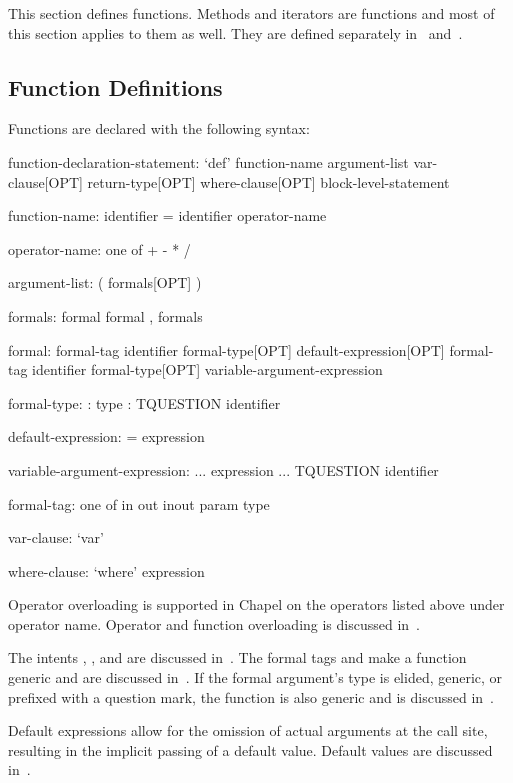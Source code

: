 \label{Functions}

This section defines functions.  Methods and iterators are functions
and most of this section applies to them as well.  They are defined
separately in~ and~.

\subsection{Function Definitions}
\label{Function_Definitions}

Functions are declared with the following syntax:
\begin{syntax}
function-declaration-statement:
  `def' function-name argument-list var-clause[OPT]
    return-type[OPT] where-clause[OPT] block-level-statement

function-name:
  identifier
  = identifier
  operator-name

operator-name: one of
  + - * / %

argument-list:
  ( formals[OPT] )

formals:
  formal
  formal , formals

formal:
  formal-tag identifier formal-type[OPT] default-expression[OPT]
  formal-tag identifier formal-type[OPT] variable-argument-expression

formal-type:
  : type
  : TQUESTION identifier

default-expression:
  = expression

variable-argument-expression:
  ... expression
  ... TQUESTION identifier

formal-tag: one of
  in out inout param type

var-clause:
  `var'

where-clause:
  `where' expression
\end{syntax}

Operator overloading is supported in Chapel on the operators listed
above under operator name.  Operator and function overloading is
discussed in~.

The intents , , and  are discussed
in~.  The formal tags  and  make
a function generic and are discussed in~.  If the
formal argument's type is elided, generic, or prefixed with a question
mark, the function is also generic and is discussed
in~.

Default expressions allow for the omission of actual arguments at the
call site, resulting in the implicit passing of a default value.
Default values are discussed in~.

